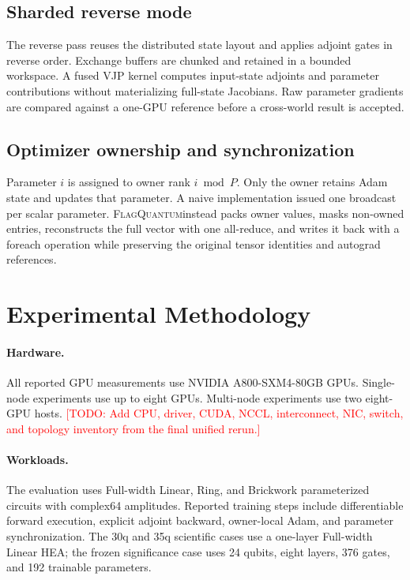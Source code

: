 \documentclass[10pt,twocolumn]{article}
\newcommand{\system}{\textsc{FlagQuantum}}
\newcommand{\todo}[1]{\textcolor{red}{[TODO: #1]}}
\begin{document}
\subsection{Sharded reverse mode}

The reverse pass reuses the distributed state layout and applies adjoint gates
in reverse order.  Exchange buffers are chunked and retained in a bounded
workspace.  A fused VJP kernel computes input-state adjoints and parameter
contributions without materializing full-state Jacobians.  Raw parameter
gradients are compared against a one-GPU reference before a cross-world result
is accepted.

\subsection{Optimizer ownership and synchronization}

Parameter \(i\) is assigned to owner rank \(i\bmod P\).  Only the owner retains
Adam state and updates that parameter.  A naive implementation issued one
broadcast per scalar parameter.  \system instead packs owner values, masks
non-owned entries, reconstructs the full vector with one all-reduce, and writes
it back with a foreach operation while preserving the original tensor
identities and autograd references.

\section{Experimental Methodology}
\label{sec:methodology}

\paragraph{Hardware.}
All reported GPU measurements use NVIDIA A800-SXM4-80GB GPUs.  Single-node
experiments use up to eight GPUs.  Multi-node experiments use two eight-GPU
hosts.  \todo{Add CPU, driver, CUDA, NCCL, interconnect, NIC, switch, and
topology inventory from the final unified rerun.}

\paragraph{Workloads.}
The evaluation uses Full-width Linear, Ring, and Brickwork parameterized
circuits with complex64 amplitudes.  Reported training steps include
differentiable forward execution, explicit adjoint backward, owner-local Adam,
and parameter synchronization.  The 30q and 35q scientific cases use a
one-layer Full-width Linear HEA; the frozen significance case uses 24 qubits,
eight layers, 376 gates, and 192 trainable parameters.
\end{document}

